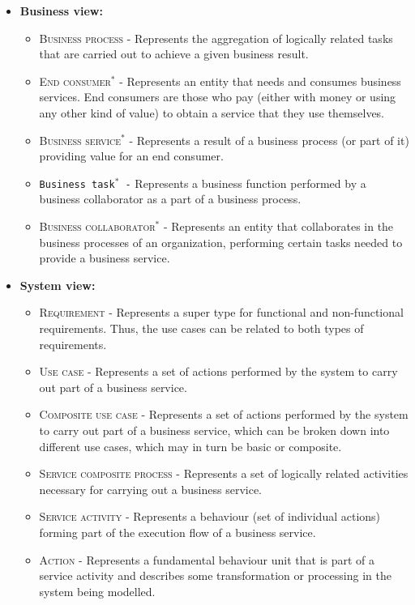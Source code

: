 \begin{itemize}
   \item \textbf{Business view:}
		\begin{itemize}
		  \item \textsc{Business process -} Represents the aggregation of
		  logically related tasks that are carried out to achieve a given business result.
		  \item \textsc{End consumer$^\ast$ -} Represents an entity that needs and
		  consumes business services. End consumers are those who pay (either with money or using
		  any other kind of value) to obtain a service that they use
		  themselves.
		  \item \textsc{Business service$^\ast$ -} Represents a result of a
		  business process (or part of it) providing value for an end consumer.
		  \item \texttt{Business task$^\ast$ -} Represents a business function
		  performed by a business collaborator as a part of a business process.
		  \item \textsc{Business collaborator$^\ast$ -} Represents an entity that
		  collaborates in the business processes of an organization, performing certain tasks needed
		  to provide a business service.
		  
		\end{itemize}

\item \textbf{System view:}	
	\begin{itemize}
	  \item \textsc{Requirement -} Represents a super type for functional and
	  non-functional requirements. Thus, the use cases can be related to both types
	  of requirements.	
	  \item \textsc{Use case -} Represents a set of actions performed by the system
	  to carry out part of a business service.
	  \item \textsc{Composite use case -} Represents a set of actions performed by
	  the system to carry out part of a business service, which can be broken down
	  into different use cases, which may in turn be basic or composite.
	  \item \textsc{Service composite process -} Represents a set of logically
	  related activities necessary for carrying out a business service.
	  \item \textsc{Service activity -} Represents a behaviour (set of individual
	  actions) forming part of the execution flow of a business service.
	  \item \textsc{Action -} Represents a fundamental behaviour unit that is part
	  of a service activity and describes some transformation or processing in the
	  system being modelled.
	\end{itemize}
	

\end{itemize}
